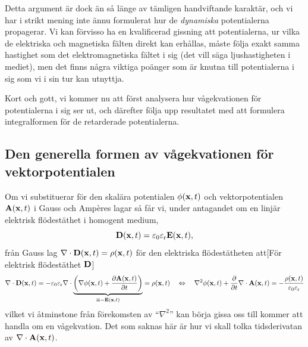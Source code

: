 {{{{{{Detta argument {\"a}r dock {\"a}n s{\aa} l{\"a}nge av t{\"a}mligen handviftande
karakt{\"a}r, och vi har i strikt mening inte {\"a}nnu formulerat hur de
{\it dynamiska} potentialerna propagerar. Vi kan f{\"o}rvisso ha en kvalificerad
gissning att potentialerna, ur vilka de elektriska och magnetiska f{\"a}lten
direkt kan erh{\aa}llas, m{\aa}ste f{\"o}lja exakt samma hastighet som det
elektromagnetiska f{\"a}ltet i sig (det vill s{\"a}ga ljushastigheten i mediet),
men det finns n{\aa}gra viktiga po{\"a}nger som {\"a}r knutna till potentialerna
i sig som vi i sin tur kan utnyttja.

Kort och gott, vi kommer nu att f{\"o}rst analysera hur v{\aa}gekvationen
f{\"o}r potentialerna i sig ser ut, och d{\"a}refter f{\"o}lja upp resultatet
med att formulera integralformen f{\"o}r de retarderade
potentialerna.
\vfill\eject

\subsection{Den generella formen av v{\aa}gekvationen f{\"o}r vektorpotentialen}
Om vi substituerar f{\"o}r den skal{\"a}ra potentialen $\phi({\bf x},t)$ och
vektorpotentialen ${\bf A}({\bf x},t)$ i Gauss och Amp{\`e}res
lagar
s{\aa} f{\aa}r vi, under antagandet om en linj{\"a}r elektrisk
fl{\"o}dest{\"a}thet i homogent medium,
$$
  {\bf D}({\bf x},t)=\varepsilon_0\varepsilon_{\rm r}{\bf E}({\bf x},t),
$$
fr{\aa}n Gauss lag $\nabla\cdot{\bf D}({\bf x},t)=\rho({\bf x},t)$ f{\"o}r den
elektriska fl{\"o}dest{\"a}theten att[F{\"o}r elektrisk
fl{\"o}dest{\"a}thet ${\bf D}$]
$$
  \nabla\cdot{\bf D}({\bf x},t)
    =-\varepsilon_0\varepsilon_{\rm r}\nabla\cdot
      \underbrace{
        \bigg(
          \nabla\phi({\bf x},t)+{{\partial{\bf A}({\bf x},t)}\over{\partial t}}
        \bigg)
      }_{\equiv-{\bf E}({\bf x},t)}
    =\rho({\bf x},t)
  \quad\Leftrightarrow\quad
    \nabla^2\phi({\bf x},t)
      +{{\partial}\over{\partial t}}\nabla\cdot{\bf A}({\bf x},t)
    =-{{\rho({\bf x},t)}\over{\varepsilon_0\varepsilon_{\rm r}}}
$$
vilket vi {\aa}tminstone fr{\aa}n f{\"o}rekomsten av ``$\nabla^2$'' kan
b{\"o}rja gissa oss till kommer att handla om en v{\aa}gekvation.
Det som saknas h{\"a}r {\"a}r hur vi skall tolka tidsderivatan av
$\nabla\cdot{\bf A}({\bf x},t)$.

}}}}}}
